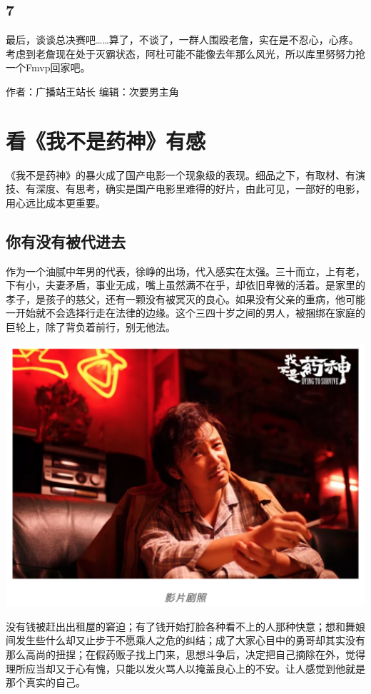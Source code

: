 \documentclass[]{book}
\begin{document}
\subsection{7}\label{section-5}

最后，谈谈总决赛吧\ldots{}\ldots{}算了，不谈了，一群人围殴老詹，实在是不忍心，心疼。考虑到老詹现在处于灭霸状态，阿杜可能不能像去年那么风光，所以库里努努力抢一个Fmvp回家吧。

作者：广播站王站长 编辑：次要男主角

\section{看《我不是药神》有感}

《我不是药神》的暴火成了国产电影一个现象级的表现。细品之下，有取材、有演技、有深度、有思考，确实是国产电影里难得的好片，由此可见，一部好的电影，用心远比成本更重要。

\subsection{你有没有被代进去}

作为一个油腻中年男的代表，徐峥的出场，代入感实在太强。三十而立，上有老，下有小，夫妻矛盾，事业无成，嘴上虽然满不在乎，却依旧卑微的活着。是家里的孝子，是孩子的慈父，还有一颗没有被冥灭的良心。如果没有父亲的重病，他可能一开始就不会选择行走在法律的边缘。这个三四十岁之间的男人，被捆绑在家庭的巨轮上，除了背负着前行，别无他法。

\includegraphics[width=6.67in]{images/yaoshen1}

没有钱被赶出出租屋的窘迫；有了钱开始打脸各种看不上的人那种快意；想和舞娘间发生些什么却又止步于不愿乘人之危的纠结；成了大家心目中的勇哥却其实没有那么高尚的扭捏；在假药贩子找上门来，思想斗争后，决定把自己摘除在外，觉得理所应当却又于心有愧，只能以发火骂人以掩盖良心上的不安。让人感觉到他就是那个真实的自己。
\end{document}
